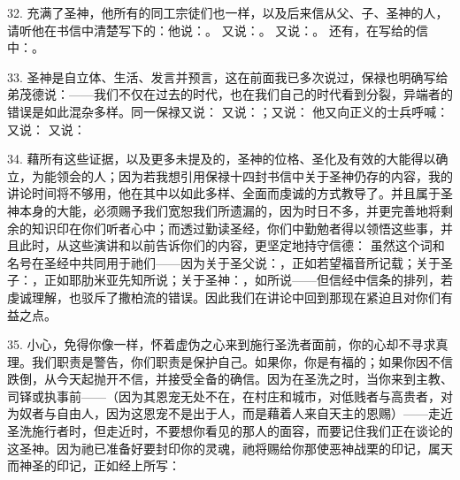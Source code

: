 32. 充满了圣神，他所有的同工宗徒们也一样，以及后来信从父、子、圣神的人，请听他在书信中清楚写下的：他说：。 又说：。 又说：。 还有，在写给的信中：。\par

33. 圣神是自立体、生活、发言并预言，这在前面我已多次说过，保禄也明确写给弟茂德说：——我们不仅在过去的时代，也在我们自己的时代看到分裂，异端者的错误是如此混杂多样。同一保禄又说： 又说：；又说： 他又向正义的士兵呼喊： 又说： 又说：\par

34. 藉所有这些证据，以及更多未提及的，圣神的位格、圣化及有效的大能得以确立，为能领会的人；因为若我想引用保禄十四封书信中关于圣神仍存的内容，我的讲论时间将不够用，他在其中以如此多样、全面而虔诚的方式教导了。并且属于圣神本身的大能，必须赐予我们宽恕我们所遗漏的，因为时日不多，并更完善地将剩余的知识印在你们听者心中；而透过勤读圣经，你们中勤勉者得以领悟这些事，并且此时，从这些演讲和以前告诉你们的内容，更坚定地持守信德： 虽然这个词和名号在圣经中共同用于祂们——因为关于圣父说：，正如若望福音所记载；关于圣子：，正如耶肋米亚先知所说；关于圣神：，如所说——但信经中信条的排列，若虔诚理解，也驳斥了撒柏流的错误。因此我们在讲论中回到那现在紧迫且对你们有益之点。\par

35. 小心，免得你像一样，怀着虚伪之心来到施行圣洗者面前，你的心却不寻求真理。我们职责是警告，你们职责是保护自己。如果你，你是有福的；如果你因不信跌倒，从今天起抛开不信，并接受全备的确信。因为在圣洗之时，当你来到主教、司铎或执事前——（因为其恩宠无处不在，在村庄和城市，对低贱者与高贵者，对为奴者与自由人，因为这恩宠不是出于人，而是藉着人来自天主的恩赐）——走近圣洗施行者时，但走近时，不要想你看见的那人的面容，而要记住我们正在谈论的这圣神。因为祂已准备好要封印你的灵魂，祂将赐给你那使恶神战栗的印记，属天而神圣的印记，正如经上所写：\par

